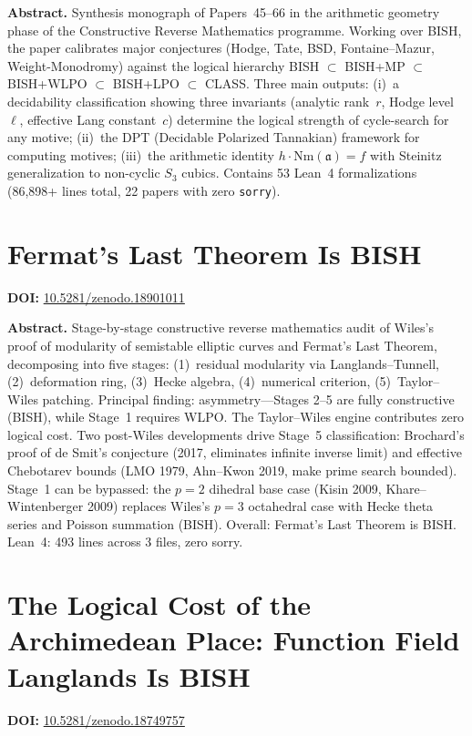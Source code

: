 \documentclass[11pt,a4paper]{article}
\begin{document}
\bigskip
\noindent\textbf{Abstract.}
Synthesis monograph of Papers~45--66 in the arithmetic geometry phase of the Constructive Reverse Mathematics programme. Working over BISH, the paper calibrates major conjectures (Hodge, Tate, BSD, Fontaine--Mazur, Weight-Monodromy) against the logical hierarchy BISH $\subset$ BISH+MP $\subset$ BISH+WLPO $\subset$ BISH+LPO $\subset$ CLASS. Three main outputs: (i)~a decidability classification showing three invariants (analytic rank~$r$, Hodge level~$\ell$, effective Lang constant~$c$) determine the logical strength of cycle-search for any motive; (ii)~the DPT (Decidable Polarized Tannakian) framework for computing motives; (iii)~the arithmetic identity $h\cdot\mathrm{Nm}(\mathfrak{a})=f$ with Steinitz generalization to non-cyclic $S_3$ cubics. Contains 53 Lean~4 formalizations (86,898+ lines total, 22 papers with zero \texttt{sorry}).

\section{Fermat's Last Theorem Is BISH}
\label{sec:p68}
\textbf{DOI:} \href{https://doi.org/10.5281/zenodo.18901011}{10.5281/zenodo.18901011}

\bigskip
\noindent\textbf{Abstract.}
Stage-by-stage constructive reverse mathematics audit of Wiles's proof of modularity of semistable elliptic curves and Fermat's Last Theorem, decomposing into five stages: (1)~residual modularity via Langlands--Tunnell, (2)~deformation ring, (3)~Hecke algebra, (4)~numerical criterion, (5)~Taylor--Wiles patching. Principal finding: asymmetry---Stages 2--5 are fully constructive (BISH), while Stage~1 requires WLPO. The Taylor--Wiles engine contributes zero logical cost. Two post-Wiles developments drive Stage~5 classification: Brochard's proof of de Smit's conjecture (2017, eliminates infinite inverse limit) and effective Chebotarev bounds (LMO 1979, Ahn--Kwon 2019, make prime search bounded). Stage~1 can be bypassed: the $p=2$ dihedral base case (Kisin 2009, Khare--Wintenberger 2009) replaces Wiles's $p=3$ octahedral case with Hecke theta series and Poisson summation (BISH). Overall: Fermat's Last Theorem is BISH. Lean~4: 493 lines across 3 files, zero sorry.

\section{The Logical Cost of the Archimedean Place: Function Field Langlands Is BISH}
\label{sec:p69}
\textbf{DOI:} \href{https://doi.org/10.5281/zenodo.18749757}{10.5281/zenodo.18749757}
\end{document}
